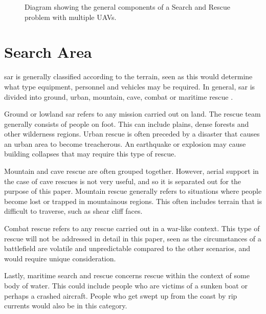 \begin{figure}[h!]

	\caption{Diagram showing the general components of a Search and Rescue problem with multiple UAVs.}
	\label{fig:CM01}
\end{figure}
\section{Search Area}
\label{sec:CM Search-Area}
\acf{sar} is generally classified according to the terrain, seen as this would determine what type equipment, personnel and vehicles may be required. In general, \ac{sar} is divided into ground, urban, mountain, cave, combat or maritime rescue \cite{Leis2021}.

Ground or lowland \ac{sar} refers to any mission carried out on land. The rescue team generally consists of people on foot. This can include plains, dense forests and other wilderness regions. Urban rescue is often preceded by a disaster that causes an urban area to become treacherous. An earthquake or explosion may cause building collapses that may require this type of rescue. 

Mountain and cave rescue are often grouped together. However, aerial support in the case of cave rescues is not very useful, and so it is separated out for the purpose of this paper. Mountain rescue generally refers to situations where people become lost or trapped in mountainous regions. This often includes terrain that is difficult to traverse, such as shear cliff faces.

Combat rescue refers to any rescue carried out in a war-like context. This type of rescue will not be addressed in detail in this paper, seen as the circumstances of a battlefield are volatile and unpredictable compared to the other scenarios, and would require unique consideration.

Lastly, maritime search and rescue concerns rescue within the context of some body of water. This could include people who are victims of a sunken boat or perhaps a crashed aircraft. People who get swept up from the coast by rip currents would also be in this category. 

